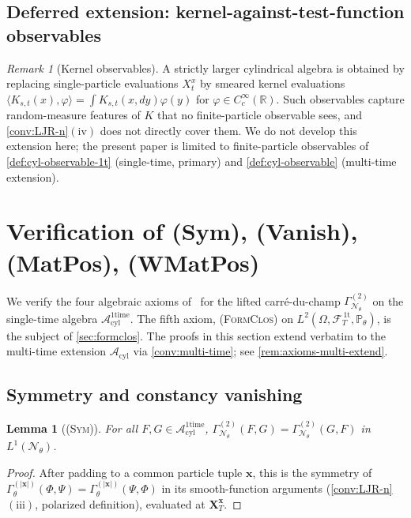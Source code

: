 \documentclass[11pt,reqno]{amsart}
\theoremstyle{plain}
\newtheorem{lemma}[theorem]{Lemma}
\theoremstyle{definition}
\theoremstyle{remark}
\newtheorem{remark}[theorem]{Remark}
\newcommand{\R}{\mathbb R}
\newcommand{\Prob}{\mathbb P}
\newcommand{\cA}{\mathcal A}
\newcommand{\cF}{\mathcal F}
\newcommand{\cN}{\mathcal N}
\newcommand{\Acyl}{\cA_{\mathrm{cyl}}}
\newcommand{\Aone}{\cA_{\mathrm{cyl}}^{\mathrm{1time}}}
\newcommand{\FT}{\cF_{T}^{\,\mathrm{1t}}}
\newcommand{\Hone}{L^{2}(\Omega,\FT,\Pth)}
\newcommand{\GamN}{\Gamma^{(2)}_{\cN_{\theta}}}
\newcommand{\GamM}[1]{\Gamma^{(#1)}_{\theta}}
\newcommand{\Pth}{\Prob_{\theta}}
\begin{document}
\subsection{Deferred extension: kernel-against-test-function
observables}\label{sec:lifted-kernel}

\begin{remark}[Kernel observables]\label{rem:kernel-obs}
A strictly larger cylindrical algebra is obtained by replacing
single-particle evaluations $X^{x}_{t}$ by smeared kernel
evaluations $\langle K_{s,t}(x),\varphi\rangle=\int K_{s,t}(x,dy)\varphi(y)$
for $\varphi\in C_{c}^{\infty}(\R)$. Such observables capture
random-measure features of $K$ that no finite-particle observable
sees, and \cref{conv:LJR-n}$(\mathrm{iv})$ does not directly cover
them. We do not develop this extension here; the present paper is
limited to finite-particle observables of
\cref{def:cyl-observable-1t} (single-time, primary) and
\cref{def:cyl-observable} (multi-time extension).
\end{remark}

\section{Verification of \texorpdfstring{(Sym), (Vanish), (MatPos),
(WMatPos)}{Sym, Vanish, MatPos, WMatPos}}\label{sec:axioms}

We verify the four algebraic axioms
of~\cite[Ass.~2.4]{GammaHierarchyDivergence} for the lifted
carr\'e-du-champ $\GamN$ on the single-time algebra $\Aone$. The
fifth axiom, {\normalfont\textsc{(FormClos)}} on $\Hone$, is the
subject of \cref{sec:formclos}. The proofs in this section extend
verbatim to the multi-time extension $\Acyl$ via
\cref{conv:multi-time}; see \cref{rem:axioms-multi-extend}.

\subsection{Symmetry and constancy vanishing}\label{sec:axioms-symvan}

\begin{lemma}[\normalfont\textsc{(Sym)}]\label{lem:sym-cyl}
For all $F,G\in\Aone$, $\GamN(F,G)=\GamN(G,F)$ in
$L^{1}(\cN_{\theta})$.
\end{lemma}

\begin{proof}
After padding to a common particle tuple $\mathbf x$, this is the
symmetry of
$\GamM{|\mathbf x|}(\Phi,\Psi)=\GamM{|\mathbf x|}(\Psi,\Phi)$ in its
smooth-function arguments (\cref{conv:LJR-n}$(\mathrm{iii})$,
polarized definition), evaluated at $\mathbf X_{T}^{\mathbf x}$.
\end{proof}
\end{document}
